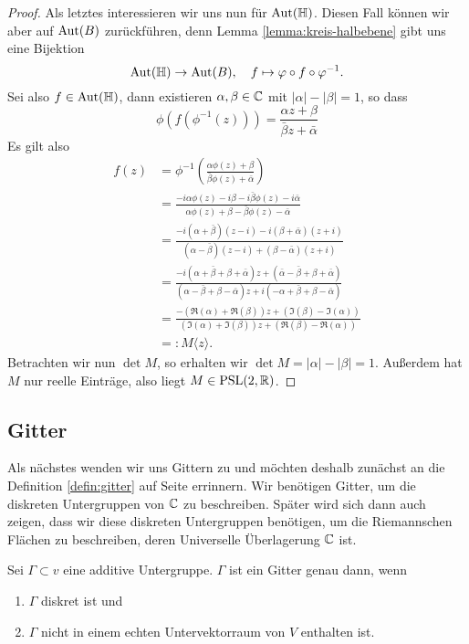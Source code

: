 \begin{proof}
  Als letztes interessieren wir uns nun für $\operatorname{Aut}(\mathbb{H})$. Diesen Fall
  können wir aber auf $\operatorname{Aut}(B)$ zurückführen, denn Lemma
  \ref{lemma:kreis-halbebene} gibt uns eine Bijektion
  \[
  \operatorname{Aut}(\mathbb{H}) \rightarrow \operatorname{Aut}(B), \quad f \mapsto \varphi \circ f \circ \varphi^{-1}.
  \]
  Sei also $f \in \operatorname{Aut}(\mathbb{H})$, dann existieren $\alpha, \beta \in \mathbb{C}$
  mit $|\alpha| - |\beta| = 1$, so dass
  \[
  \phi( f( \phi^{-1}(z))) = \frac{\alpha z + \beta}{\bar \beta z +
    \bar \alpha}
  \]
  Es gilt also
  \begin{align*}
    f(z) & = \phi^{-1} \left ( \frac{\alpha \phi(z) + \beta}{\bar
        \beta \phi(z) + \bar \alpha} \right ) \\
    & = \frac{-i \alpha \phi(z) - i \beta - i \bar \beta \phi(z) - i
      \bar \alpha}{\alpha \phi(z) + \beta - \bar \beta \phi(z) - \bar
      \alpha} \\
    & = \frac{-i (\alpha + \bar \beta)(z-i) -i (\beta + \bar
      \alpha)(z+i)}{(\alpha - \bar \beta)(z -i) + (\beta - \bar
      \alpha)(z+i)} \\
    & = \frac{-i ( \alpha + \bar \beta + \beta + \bar \alpha) z + (
      \bar \alpha - \bar \beta + \beta + \bar \alpha)}{(\alpha - \bar
      \beta + \beta - \bar \alpha)z + i (- \alpha + \bar \beta + \beta
      - \bar \alpha)} \\
    & = \frac{ - ( \Re(\alpha) + \Re(\beta)) z +  (\Im(\beta) -
      \Im(\alpha))}{(\Im(\alpha) + \Im(\beta))z + ( \Re(\beta) -
      \Re(\alpha))} \\
    & =: M\langle z \rangle.
  \end{align*}
  Betrachten wir nun $\det M$, so erhalten wir $\det M = |\alpha| -
  |\beta| = 1$. Außerdem hat $M$ nur reelle Einträge, also liegt $M
  \in \operatorname{PSL}(2, \mathbb{R})$.
\end{proof}

\subsection{Gitter}
\label{sec:gitter}

Als nächstes wenden wir uns Gittern zu und möchten deshalb zunächst an
die Definition \ref{defin:gitter} auf Seite \pageref{defin:gitter}
errinnern. Wir benötigen Gitter, um die
diskreten Untergruppen von $\mathbb{C}$ zu beschreiben. Später wird sich dann
auch zeigen, dass wir diese diskreten Untergruppen benötigen, um die
Riemannschen Flächen zu beschreiben, deren Universelle Überlagerung
$\mathbb{C}$ ist.


\begin{lemma}
  \label{lemma:gitter}
  Sei $\Gamma \subset v$ eine additive Untergruppe. $\Gamma$ ist ein
  Gitter genau dann, wenn
  \begin{enumerate}
  \item $\Gamma$ diskret ist und
  \item $\Gamma$ nicht in einem echten Untervektorraum von $V$
    enthalten ist.
  \end{enumerate}
\end{lemma}

